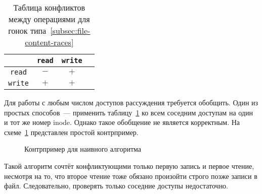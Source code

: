\begin{table}[H]
    \centering
    \begin{tabular}{cccc}
        \toprule
        & \texttt{read} & \texttt{write} \\
        \midrule
        \texttt{read} & $-$ & $+$ \\
        \texttt{write} & $+$ & $+$ \\
        \bottomrule
    \end{tabular}
    \caption{Таблица конфликтов между операциями для гонок типа~\ref{subsec:file-content-races}}
    \label{fig:conflict-table}
\end{table}

Для работы с любым числом доступов рассуждения требуется обобщить. Один из простых способов~--- применить таблицу~\ref{fig:conflict-table} ко всем соседним доступам на один и тот же номер inode. Однако такое обобщение не является корректным. На схеме~\ref{fig:naive-conflict-break} представлен простой контрпример.

\begin{figure}[H]
    \centering
    \caption{Контрпример для наивного алгоритма}
    \label{fig:naive-conflict-break}
\end{figure}

Такой алгоритм сочтёт конфликтующими только первую запись и первое чтение, несмотря на то, что второе чтение тоже обязано произойти строго позже записи в файл. Следовательно, проверять только соседние доступы недостаточно.

